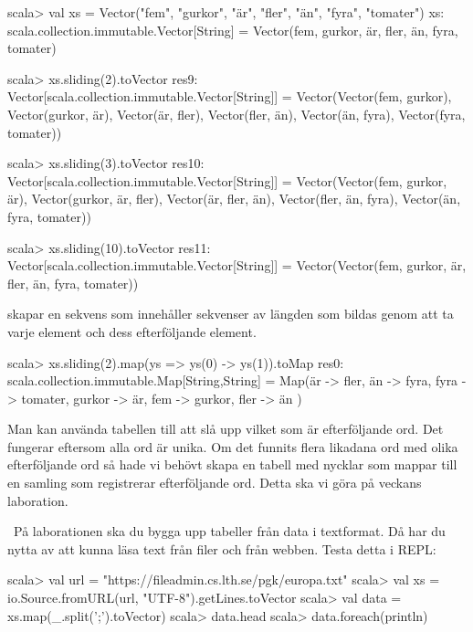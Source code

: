 \SOLUTION

\TaskSolved \what

\SubtaskSolved
\begin{REPL}
scala> val xs = Vector("fem", "gurkor", "är", "fler", "än", "fyra", "tomater")
xs: scala.collection.immutable.Vector[String] =
Vector(fem, gurkor, är, fler, än, fyra, tomater)

scala> xs.sliding(2).toVector
res9: Vector[scala.collection.immutable.Vector[String]] =
Vector(Vector(fem, gurkor), Vector(gurkor, är), Vector(är, fler), Vector(fler, än), Vector(än, fyra), Vector(fyra, tomater))

scala> xs.sliding(3).toVector
res10: Vector[scala.collection.immutable.Vector[String]] =
Vector(Vector(fem, gurkor, är), Vector(gurkor, är, fler), Vector(är, fler, än), Vector(fler, än, fyra), Vector(än, fyra, tomater))

scala> xs.sliding(10).toVector
res11: Vector[scala.collection.immutable.Vector[String]] =
Vector(Vector(fem, gurkor, är, fler, än, fyra, tomater))

\end{REPL}
 skapar en sekvens som innehåller sekvenser av längden  som bildas genom att ta varje element och dess  efterföljande element.

\SubtaskSolved
\begin{REPL}
scala> xs.sliding(2).map(ys => ys(0) -> ys(1)).toMap
res0: scala.collection.immutable.Map[String,String] =
Map(är -> fler,
    än -> fyra,
    fyra -> tomater,
    gurkor -> är,
    fem -> gurkor,
    fler -> än
)
\end{REPL}
Man kan använda tabellen till att slå upp vilket som är efterföljande ord. Det fungerar eftersom alla ord är unika. Om det funnits flera likadana ord med olika efterföljande ord så hade vi behövt skapa en tabell med nycklar som mappar till en samling som registrerar efterföljande ord. Detta ska vi göra på veckans laboration.

\QUESTEND





\QUESTBEGIN

\Task \what~På laborationen ska du bygga upp tabeller från data i textformat. Då har du nytta av att kunna läsa text från filer och från webben. Testa detta i REPL:
\begin{REPL}
scala> val url = "https://fileadmin.cs.lth.se/pgk/europa.txt"
scala> val xs = io.Source.fromURL(url, "UTF-8").getLines.toVector
scala> val data = xs.map(_.split(';').toVector)
scala> data.head
scala> data.foreach(println)
\end{REPL}

